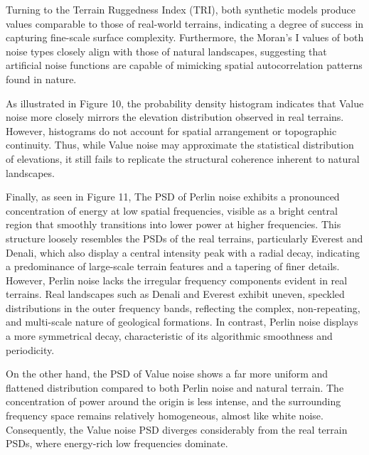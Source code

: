 Turning to the Terrain Ruggedness Index (TRI), both synthetic models produce values comparable to those of real-world terrains, indicating a degree of success in capturing fine-scale surface complexity. 
Furthermore, the Moran's I values of both noise types closely align with those of natural landscapes, suggesting that artificial noise functions are capable of mimicking spatial autocorrelation patterns 
found in nature.

As illustrated in Figure 10, the probability density histogram indicates that Value noise more closely mirrors the elevation distribution observed in real terrains. However, histograms do not account for 
spatial arrangement or topographic continuity. Thus, while Value noise may approximate the statistical distribution of elevations, it still fails to replicate the structural coherence inherent to natural 
landscapes.

Finally, as seen in Figure 11, The PSD of Perlin noise exhibits a pronounced concentration of energy at low spatial frequencies, visible as a bright central region that smoothly transitions into lower 
power at higher frequencies. This structure loosely resembles the PSDs of the real terrains, particularly Everest and Denali, which also display a central intensity peak with a radial decay, indicating 
a predominance of large-scale terrain features and a tapering of finer details. However, Perlin noise lacks the irregular frequency components evident in real terrains. Real landscapes such as Denali and 
Everest exhibit uneven, speckled distributions in the outer frequency bands, reflecting the complex, non-repeating, and multi-scale nature of geological formations. In contrast, Perlin noise displays a 
more symmetrical decay, characteristic of its algorithmic smoothness and periodicity.

On the other hand, the PSD of Value noise shows a far more uniform and flattened distribution compared to both Perlin noise and natural terrain. The concentration of power around the origin is less intense, 
and the surrounding frequency space remains relatively homogeneous, almost like white noise. Consequently, the Value noise PSD diverges considerably from the real terrain PSDs, where energy-rich low 
frequencies dominate. 
